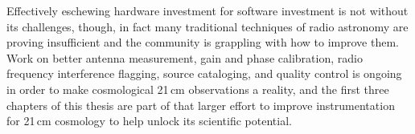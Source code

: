 Effectively eschewing hardware investment for software investment is not without its challenges, though, in fact many traditional techniques of radio astronomy are proving insufficient and the community is grappling with how to improve them. Work on better antenna measurement, gain and phase calibration, radio frequency interference flagging, source cataloging, and quality control is ongoing in order to make cosmological 21\,cm observations a reality, and the first three chapters of this thesis are part of that larger effort to improve instrumentation for 21\,cm cosmology to help unlock its scientific potential.


%
%
%
%
%
%



%




%
%
%
%
